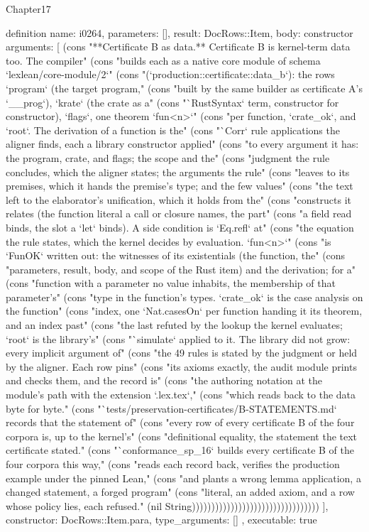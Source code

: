 \begin{lexlean}{Chapter17}
\begin{semanticmodule}
definition{
  name: i0264,
  parameters: [],
  result: DocRows::Item,
  body: constructor{
    arguments: [
      (cons "**Certificate B as data.** Certificate B is kernel-term data too. The compiler" (cons "builds each as a native core module of schema `lexlean/core-module/2`" (cons "(`production::certificate::data_b`): the rows `program` (the target program," (cons "built by the same builder as certificate A's `__prog`), `krate` (the crate as a" (cons "`RustSyntax` term, constructor for constructor), `flags`, one theorem `fun<n>`" (cons "per function, `crate_ok`, and `root`. The derivation of a function is the" (cons "`Corr` rule applications the aligner finds, each a library constructor applied" (cons "to every argument it has: the program, crate, and flags; the scope and the" (cons "judgment the rule concludes, which the aligner states; the arguments the rule" (cons "leaves to its premises, which it hands the premise's type; and the few values" (cons "the text left to the elaborator's unification, which it holds from the" (cons "constructs it relates (the function literal a call or closure names, the part" (cons "a field read binds, the slot a `let` binds). A side condition is `Eq.refl` at" (cons "the equation the rule states, which the kernel decides by evaluation. `fun<n>`" (cons "is `FunOK` written out: the witnesses of its existentials (the function, the" (cons "parameters, result, body, and scope of the Rust item) and the derivation; for a" (cons "function with a parameter no value inhabits, the membership of that parameter's" (cons "type in the function's types. `crate_ok` is the case analysis on the function" (cons "index, one `Nat.casesOn` per function handing it its theorem, and an index past" (cons "the last refuted by the lookup the kernel evaluates; `root` is the library's" (cons "`simulate` applied to it. The library did not grow: every implicit argument of" (cons "the 49 rules is stated by the judgment or held by the aligner. Each row pins" (cons "its axioms exactly, the audit module prints and checks them, and the record is" (cons "the authoring notation at the module's path with the extension `.lex.tex`," (cons "which reads back to the data byte for byte." (cons "`tests/preservation-certificates/B-STATEMENTS.md` records that the statement of" (cons "every row of every certificate B of the four corpora is, up to the kernel's" (cons "definitional equality, the statement the text certificate stated." (cons "`conformance_sp_16` builds every certificate B of the four corpora this way," (cons "reads each record back, verifies the production example under the pinned Lean," (cons "and plants a wrong lemma application, a changed statement, a forged program" (cons "literal, an added axiom, and a row whose policy lies, each refused." (nil String)))))))))))))))))))))))))))))))))
    ],
    constructor: DocRows::Item.para,
    type_arguments: []
  },
  executable: true
}


\end{semanticmodule}
\end{lexlean}
